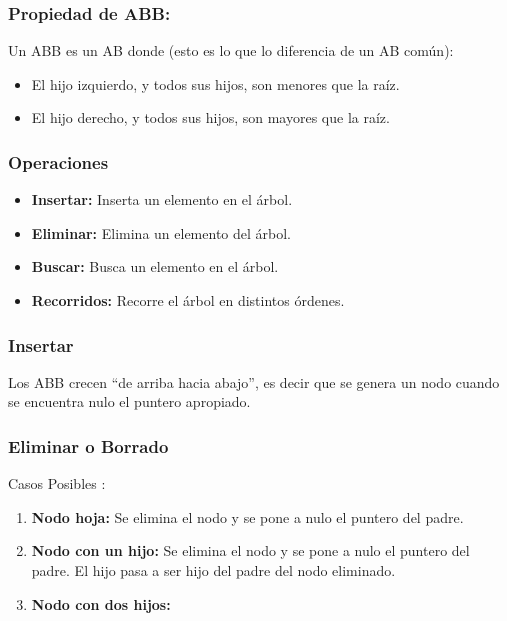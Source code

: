 \documentclass[../main.tex]{subfiles}
\begin{document}
        \subsubsection{Propiedad de ABB:} 
            Un ABB es un AB donde (esto es lo que lo diferencia de un AB común):
            \begin{itemize}
                \item El hijo izquierdo, y todos sus hijos, son menores que la raíz.
                \item El hijo derecho, y todos sus hijos, son mayores que la raíz.
            \end{itemize}


        \subsubsection{Operaciones}
            \begin{itemize}
                \item \textbf{Insertar:} Inserta un elemento en el árbol.
                \item \textbf{Eliminar:} Elimina un elemento del árbol.
                \item \textbf{Buscar:} Busca un elemento en el árbol.
                \item \textbf{Recorridos:} Recorre el árbol en distintos órdenes.
            \end{itemize}

        \subsubsection{Insertar} 
            Los ABB crecen “de arriba hacia abajo”, es decir que se genera un nodo cuando se encuentra nulo el puntero apropiado.
        
        \subsubsection{Eliminar o Borrado} 
            Casos Posibles \cite{ABB-Eliminar_nodos} :
            \begin{enumerate}
                \item \textbf{Nodo hoja:} Se elimina el nodo y se pone a nulo el puntero del padre.
                \item \textbf{Nodo con un hijo:} Se elimina el nodo y se pone a nulo el puntero del padre. El hijo pasa a ser hijo del padre del nodo eliminado.
                \item \textbf{Nodo con dos hijos:} 
            \end{enumerate}
\end{document}
